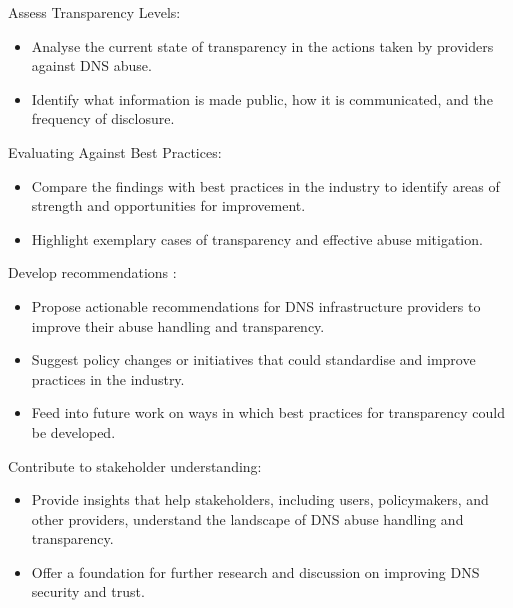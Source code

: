 Assess Transparency Levels:

\begin{itemize}
  \item Analyse the current state of transparency in the actions taken by providers against DNS abuse.
  \item Identify what information is made public, how it is communicated, and the frequency of disclosure.
\end{itemize}

Evaluating Against Best Practices:

\begin{itemize}
  \item Compare the findings with best practices in the industry to identify areas of strength and opportunities for improvement.
  \item Highlight exemplary cases of transparency and effective abuse mitigation.
\end{itemize}

Develop recommendations :

\begin{itemize}
  \item Propose actionable recommendations for DNS infrastructure providers to improve their abuse handling and transparency.
  \item Suggest policy changes or initiatives that could standardise and improve practices in the industry.
  \item Feed into future work on ways in which best practices for transparency could be developed.
\end{itemize}

Contribute to stakeholder understanding: 

\begin{itemize}
  \item Provide insights that help stakeholders, including users, policymakers, and other providers, understand the landscape of DNS abuse handling and transparency.
  \item Offer a foundation for further research and discussion on improving DNS security and trust.
\end{itemize}

